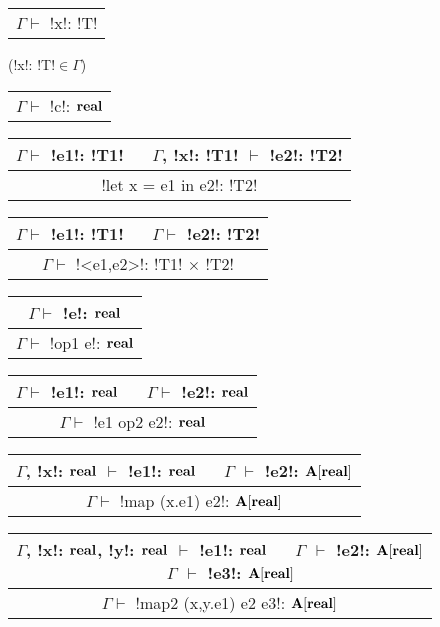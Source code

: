 \begin{figure*}[tb]
    \centering
    \begin{tabular}{c} 
    \\\hline
    $\Gamma \vdash$ !x!: !T!
    \end{tabular}(!x!: !T!$\in\Gamma$)
    \hspace{0.5cm}
    \begin{tabular}{c} 
        \\\hline
        $\Gamma \vdash$ !c!: $\mathbf{real}$
    \end{tabular}
    \hspace{0.5cm}
    \begin{tabular}{c}
    $\Gamma \vdash$ !e1!: !T1! $\quad$ $\Gamma$, !x!: !T1! $\vdash$ !e2!: !T2! \\\hline
    !let x = e1 in e2!: !T2!
    \end{tabular}

    \begin{tabular}{c}
    $\Gamma \vdash$ !e1!: !T1! $\quad$ $\Gamma \vdash$ !e2!: !T2! \\\hline  
    $\Gamma \vdash$ !<e1,e2>!: !T1! $\times$ !T2!
    \end{tabular}
    \hspace{0.5cm}
    \begin{tabular}{c}
        $\Gamma \vdash$ !e!: $\mathbf{real}$ \\\hline  
        $\Gamma \vdash$ !op1 e!: $\mathbf{real}$
    \end{tabular}
    \hspace{0.5cm}
    \begin{tabular}{c}
        $\Gamma \vdash$ !e1!: $\mathbf{real}$ $\quad$ $\Gamma \vdash$ !e2!: $\mathbf{real}$ \\\hline  
        $\Gamma \vdash$ !e1 op2 e2!: $\mathbf{real}$
        \end{tabular}
 

    \begin{tabular}{c}
        $\Gamma$, !x!: $\mathbf{real}$ $\vdash$ !e1!: $\mathbf{real}$ $\quad$ $\Gamma$ $\vdash$ !e2!: $\mathbf{A}[\mathbf{real}]$
        \\\hline  
        $\Gamma \vdash$ !map (x.e1) e2!: $\mathbf{A}[\mathbf{real}]$
    \end{tabular}

    \begin{tabular}{c}
        $\Gamma$, !x!: $\mathbf{real}$, !y!: $\mathbf{real}$ $\vdash$ !e1!: $\mathbf{real}$ 
        $\quad$ $\Gamma$ $\vdash$ !e2!: $\mathbf{A}[\mathbf{real}]$
        $\quad$ $\Gamma$ $\vdash$ !e3!: $\mathbf{A}[\mathbf{real}]$
        \\\hline  
        $\Gamma \vdash$ !map2 (x,y.e1) e2 e3!: $\mathbf{A}[\mathbf{real}]$
    \end{tabular}


\end{figure*}
